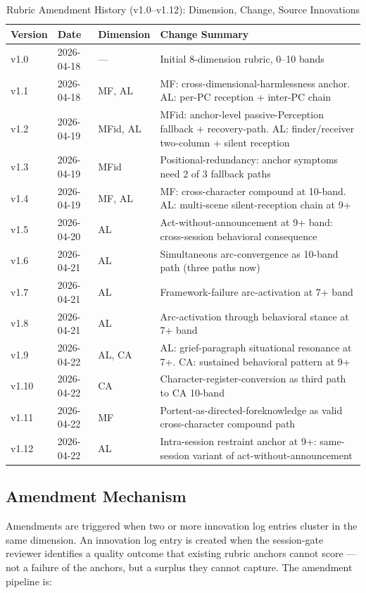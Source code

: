 \begin{table}[t]
\caption{Rubric Amendment History (v1.0–v1.12): Dimension, Change, Source Innovations}
\label{tab:amendments}
\begin{tabular}{@{}lllp{5.5cm}@{}}
\toprule
Version & Date & Dimension & Change Summary \\
\midrule
v1.0 & 2026-04-18 & --- & Initial 8-dimension rubric, 0--10 bands \\
v1.1 & 2026-04-18 & MF, AL & MF: cross-dimensional-harmlessness anchor. AL: per-PC reception + inter-PC chain \\
v1.2 & 2026-04-19 & MFid, AL & MFid: anchor-level passive-Perception fallback + recovery-path. AL: finder/receiver two-column + silent reception \\
v1.3 & 2026-04-19 & MFid & Positional-redundancy: anchor symptoms need 2 of 3 fallback paths \\
v1.4 & 2026-04-19 & MF, AL & MF: cross-character compound at 10-band. AL: multi-scene silent-reception chain at 9+ \\
v1.5 & 2026-04-20 & AL & Act-without-announcement at 9+ band: cross-session behavioral consequence \\
v1.6 & 2026-04-21 & AL & Simultaneous arc-convergence as 10-band path (three paths now) \\
v1.7 & 2026-04-21 & AL & Framework-failure arc-activation at 7+ band \\
v1.8 & 2026-04-21 & AL & Arc-activation through behavioral stance at 7+ band \\
v1.9 & 2026-04-22 & AL, CA & AL: grief-paragraph situational resonance at 7+. CA: sustained behavioral pattern at 9+ \\
v1.10 & 2026-04-22 & CA & Character-register-conversion as third path to CA 10-band \\
v1.11 & 2026-04-22 & MF & Portent-as-directed-foreknowledge as valid cross-character compound path \\
v1.12 & 2026-04-22 & AL & Intra-session restraint anchor at 9+: same-session variant of act-without-announcement \\
\bottomrule
\end{tabular}
\end{table}

\subsection{Amendment Mechanism}

Amendments are triggered when two or more innovation log entries cluster in the same
dimension. An innovation log entry is created when the session-gate reviewer identifies
a quality outcome that existing rubric anchors cannot score --- not a failure of the
anchors, but a surplus they cannot capture. The amendment pipeline is:

